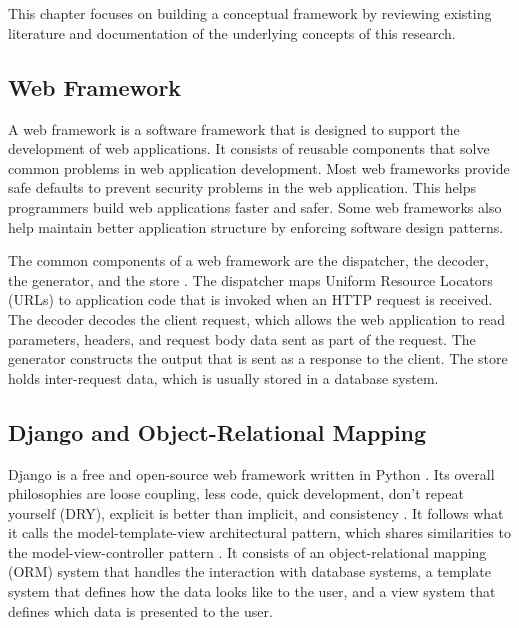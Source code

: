 \chapter{\babDua}

This chapter focuses on building a conceptual framework by reviewing existing
literature and documentation of the underlying concepts of this research.

\section{Web Framework}

A web framework is a software framework that is designed to support the
development of web applications. It consists of reusable components that solve
common problems in web application development. Most web frameworks provide
safe defaults to prevent security problems in the web application. This helps
programmers build web applications faster and safer. Some web frameworks also
help maintain better application structure by enforcing software design
patterns.

The common components of a web framework are the dispatcher, the decoder, the
generator, and the store \cite{schwarz_webframework}. The dispatcher maps
Uniform Resource Locators (URLs) to application code that is invoked when an
HTTP request is received. The decoder decodes the client request, which allows
the web application to read parameters, headers, and request body data sent as
part of the request. The generator constructs the output that is sent as a
response to the client. The store holds inter-request data, which is usually
stored in a database system.

\section{Django and Object-Relational Mapping}

Django is a free and open-source web framework written in Python \cite{django}.
Its overall philosophies are loose coupling, less code, quick development,
don't repeat yourself (DRY), explicit is better than implicit, and consistency
\cite{django:philosophies}. It follows what it calls the model-template-view
architectural pattern, which shares similarities to the model-view-controller
pattern \cite{django:faq}. It consists of an object-relational mapping (ORM)
system that handles the interaction with database systems, a template system
that defines how the data looks like to the user, and a view system that
defines which data is presented to the user.

